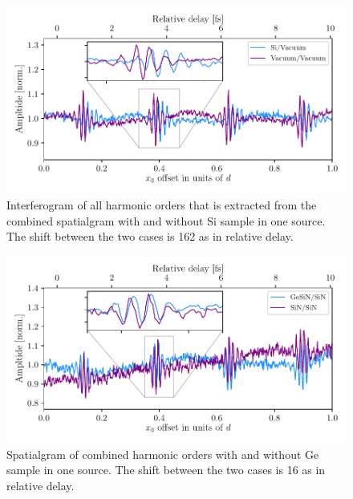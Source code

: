 \begin{figure}
	\centering
	\includegraphics[width=1.0\textwidth]{figures/refractive_index/cross_correlation_si.pdf}
	\caption[Interferogram of all harmonic orders with and without Si sample in one source]{Interferogram of all harmonic orders that is extracted from the combined spatialgram with and without Si sample in one source.  The shift between the two cases is 162 as in relative delay.}
	\label{fig:interferogram_si}
\end{figure}

\begin{figure}
	\centering
	\includegraphics[width=1.0\textwidth]{figures/refractive_index/cross_correlation_ge.pdf}
	\caption[Spatialgram of combined harmonic orders with and without Ge sample in one source]{Spatialgram of combined harmonic orders with and without Ge sample in one source. The shift between the two cases is 16 as in relative delay.}
	\label{fig:interferogram_ge}
\end{figure}

